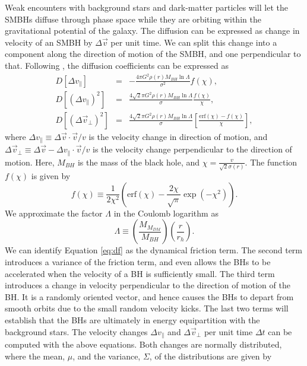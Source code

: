 \documentclass[fleqn,usenatbib,useAMS]{mnras}
\begin{document}
Weak encounters with background stars and dark-matter particles will let the SMBHs diffuse through phase space while they are orbiting within the gravitational potential of the galaxy. The diffusion can be expressed as change in velocity of an SMBH by $\Delta \vec{v}$ per unit time. We can split this change into a component along the direction of motion of the SMBH, and one perpendicular to that. Following \citet{2008gady.book.....B}, the diffusion coefficients can be expressed as 
\begin{eqnarray}\label{eq:df}
D[\Delta v_\parallel] & = & -\frac{4\pi G^2\rho(r)M_{BH}\ln\Lambda}{\sigma^2}f(\chi),\\
D[(\Delta v_\parallel)^2] & = & \frac{4\sqrt{2}\pi G^2\rho(r)M_{BH}\ln\Lambda}{\sigma}\frac{f(\chi)}{\chi},\\
D[(\Delta \vec{v}_\bot)^2] & = & \frac{4\sqrt{2}\pi G^2\rho(r)M_{BH}\ln\Lambda}{\sigma}\left[\frac{\mbox{erf}(\chi)-f(\chi)}{\chi}\right],
\end{eqnarray} 
where $\Delta v_\parallel \equiv \Delta \vec{v}\cdot\vec{v}/v$ is the velocity change in direction of motion, and $\Delta \vec{v}_\bot \equiv \Delta \vec{v} - \Delta v_\parallel \cdot\vec{v}/v$ is the velocity change perpendicular to the direction of motion. Here, $M_{BH}$ is the mass of the black hole, and $\chi = \frac{v}{\sqrt{2}\sigma(r)}$. The function $f(\chi)$ is given by 
\begin{equation}
f(\chi) \equiv \frac{1}{2\chi^2}\left(\mbox{erf}(\chi)-\frac{2\chi}{\sqrt{\pi}}\exp\left(-\chi^2\right)\right).
\end{equation}
We approximate the factor $\Lambda$ in the Coulomb logarithm as
\begin{equation}
\Lambda \equiv \left(\frac{M_{M_{DM}}}{M_{BH}}\right)\left(\frac{r}{r_h}\right).
\end{equation}
We can identify Equation \ref{eq:df} as the dynamical friction term. The second term introduces a variance of the friction term, and even allows the BHs to be accelerated when the velocity of a BH is sufficiently small. The third term introduces a change in velocity perpendicular to the direction of motion of the BH. It is a randomly oriented vector, and hence causes the BHs to depart from smooth orbits due to the small random velocity kicks. The last two terms will establish that the BHs are ultimately in energy equipartition with the background stars.
The velocity changes $\Delta v_\parallel$ and $\Delta\vec{v}_\bot$ per unit time $\Delta t$ can be computed with the above equations. Both changes are normally distributed, where the mean, $\mu$, and the variance, $\Sigma$, of the distributions are given by
\end{document}
